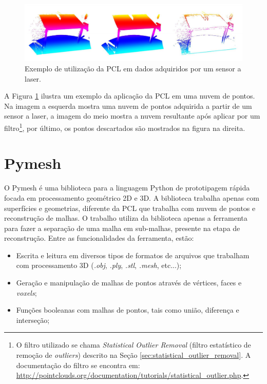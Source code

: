\begin{figure}[H]
    \centering
    \includegraphics[scale=0.3]{dados/figuras/pcl_example.png}
    \caption{Exemplo de utilização da PCL em dados adquiridos por um sensor a laser.}
    \vspace{-0.8em}
    \label{fig:pcl_example}
\end{figure}

A Figura \ref{fig:pcl_example} ilustra um exemplo da aplicação da PCL em uma nuvem de pontos. Na imagem a esquerda mostra uma nuvem de pontos adquirida a partir de um sensor a laser, a imagem do meio mostra a nuvem resultante após aplicar por um filtro\footnote{O filtro utilizado se chama \textit{Statistical Outlier Removal} (filtro estatístico de remoção de \textit{outliers}) descrito na Seção \ref{sec:statistical_outlier_removal}. A documentação do filtro se encontra em: \url{http://pointclouds.org/documentation/tutorials/statistical_outlier.php}.}, por último, os pontos descartados são mostrados na figura na direita.

\section{Pymesh}
\label{sec:pymesh}
O Pymesh é uma biblioteca para a linguagem Python de prototipagem rápida focada em processamento geométrico 2D e 3D. 
A biblioteca trabalha apenas com superfícies e geometrias, diferente da PCL que trabalha com nuvem de pontos e reconstrução de malhas. 
O trabalho utiliza da biblioteca apenas a ferramenta para fazer a separação de uma malha em sub-malhas, presente na etapa de reconstrução.
Entre as funcionalidades da ferramenta, estão: 

\vspace{0.5em}
\begin{itemize}
    \item Escrita e leitura em diversos tipos de formatos de arquivos que trabalham com processamento 3D (\textit{.obj}, \textit{.ply}, \textit{.stl}, \textit{.mesh}, etc...);
    \item Geração e manipulação de malhas de pontos através de vértices, faces e \textit{voxels};
    \item Funções booleanas com malhas de pontos, tais como união, diferença e interseção;
\end{itemize}
\vspace{1em}


